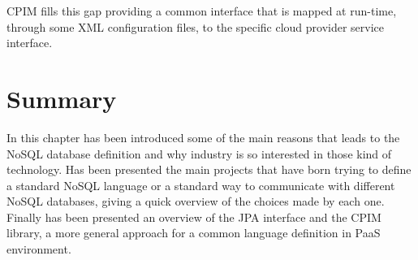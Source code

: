 \noindent CPIM fills this gap providing a common interface that is mapped at run-time, through some XML configuration files, to the specific cloud provider service interface.

\section{Summary}
In this chapter has been introduced some of the main reasons that leads to the NoSQL database definition and why industry is so interested in those kind of technology. 
\noindent Has been presented the main projects that have born trying to define a standard NoSQL language or a standard way to communicate with different NoSQL databases, giving a quick overview of the choices made by each one. 
\noindent Finally has been presented an overview of the JPA interface and the CPIM library, a more general approach for a common language definition in PaaS environment.
